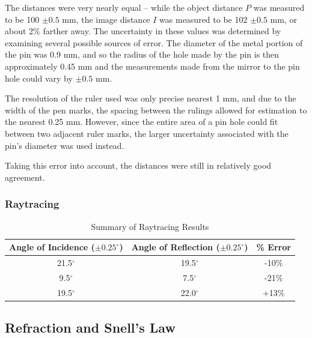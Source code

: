 \documentclass[twocolumn,english]{IEEEtran}
\theoremstyle{plain}
\theoremstyle{plain}
\begin{document}
The distances were very nearly equal -- while the object distance $P$ was measured to be 100 $\pm 0.5$ mm, the image distance $I$ was measured to be 102 $\pm 0.5$ mm, or about 2\% farther away. The uncertainty in these values was determined by examining several possible sources of error. The diameter of the metal portion of the pin was 0.9 mm, and so the radius of the hole made by the pin is then approximately 0.45 mm and the measurements made from the mirror to the pin hole could vary by $\pm 0.5$ mm.

The resolution of the ruler used was only precise nearest 1 mm, and due to the width of the pen marks, the spacing between the rulings allowed for estimation to the nearest 0.25 mm. However, since the entire area of a pin hole could fit between two adjacent ruler marks, the larger uncertainty associated with the pin's diameter was used instead.

Taking this error into account, the distances were still in relatively good agreement.

\subsubsection{Raytracing}

\begin{table}[!H]
\centering{}
\caption{Summary of Raytracing Results}
\label{tb:raytracing}
\begin{tabular}{@{}ccc@{}}
\toprule
\textbf{Angle of Incidence ($\pm 0.25^{\circ}$)} & \textbf{Angle of  Reflection ($\pm 0.25^{\circ}$)} & \textbf{\% Error}	\\ \midrule
	21.5$^{\circ}$          &	19.5$^{\circ}$              & -10\%       		\\ \midrule
	9.5$^{\circ}$			&	7.5$^{\circ}$				& -21\%            	\\ \midrule
    19.5$^{\circ}$          &	22.0$^{\circ}$              & +13\%             \\ \bottomrule
\end{tabular}
\end{table}

\subsection{\textbf{Refraction and Snell's Law}}
\end{document}
